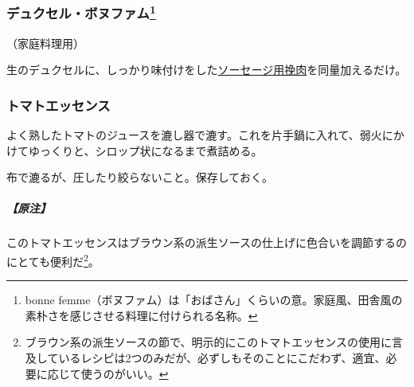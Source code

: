 \begin{recette}
\hypertarget{duxelles-bonne-femme}{%
\subsubsection[デュクセル・ボヌファム]{\texorpdfstring{デュクセル・ボヌファム\footnote{bonne
  femme（ボヌファム）は「おばさん」くらいの意。家庭風、田舎風の素朴さを感じさせる料理に付けられる名称。}}{デュクセル・ボヌファム}}\label{duxelles-bonne-femme}}



（家庭料理用）

生のデュクセルに、しっかり味付けをした\protect\hyperlink{chair-a-saucisse}{ソーセージ用挽肉}を同量加えるだけ。

\atoaki{}

\hypertarget{essence-de-tomate}{%
\subsubsection{トマトエッセンス}\label{essence-de-tomate}}



よく熟したトマトのジュースを漉し器で漉す。これを片手鍋に入れて、弱火にかけてゆっくりと、シロップ状になるまで煮詰める。

布で漉るが、圧したり絞らないこと。保存しておく。

\hypertarget{nota-essence-de-tomate}{%
\subparagraph{【原注】}\label{nota-essence-de-tomate}}

このトマトエッセンスはブラウン系の派生ソースの仕上げに色合いを調節するのにとても便利だ\footnote{ブラウン系の派生ソースの節で、明示的にこのトマトエッセンスの使用に言及しているレシピは2つのみだが、必ずしもそのことにこだわず、適宜、必要に応じて使うのがいい。}。

\atoaki{}

\hypertarget{fonds-de-plats}{%
}
\end{recette}
